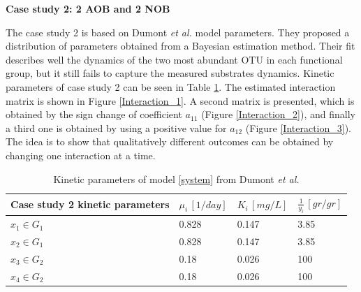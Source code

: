 \documentclass[3p,times]{article}
\begin{document}
\textbf{Case study 2: 2 AOB and 2 NOB}

 The case study 2 is based on Dumont \textit{et al.}\cite{Dumont2016} model parameters. They proposed a distribution of parameters obtained from a Bayesian estimation method. Their fit describes well the dynamics of the two most abundant OTU in each functional group, but it still fails to capture the measured substrates dynamics. Kinetic parameters of case study 2 can be seen in Table \ref{kinetic_parameters}. The estimated interaction matrix is shown in Figure \ref{Interaction_1}. A second matrix is presented, which is obtained by the sign change of coefficient $a_{11}$ (Figure \ref{Interaction_2}), and finally a third one is obtained by using a positive value for $a_{12}$ (Figure \ref{Interaction_3}). The idea is to show that qualitatively different outcomes can be obtained by changing one interaction at a time.
 
 \begin{table}[ht]
 	\centering
 	\begin{tabular}{|l|l|l|l|}
 		\hline \rule{0pt}{3.5ex}
 		Case study 2 kinetic parameters & $\mu_i\,[1/day]$ & $K_i\,[mg/L]$ & $\frac{1}{y_i} \, [gr/gr]$ \\ \hline 
 		$x_1 \in G_1$ & 0.828  & 0.147 & 3.85  \\ \hline
 		$x_2\in G_1$ &0.828   & 0.147 &  3.85\\ \hline
 		$x_3\in G_2$ & 0.18 & 0.026 &  100 \\ \hline
 		$x_4\in G_2$ & 0.18 & 0.026 &  100 \\ \hline
 	\end{tabular}
 	\caption{Kinetic parameters of model \eqref{system} from Dumont \textit{et al.} \cite{Dumont2016}}
 	\label{kinetic_parameters}
 \end{table}
\end{document}
